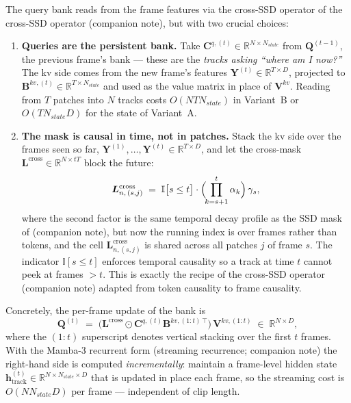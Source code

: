 \documentclass[11pt,a4paper]{article}
\begin{document}
The query bank reads from the frame features via the cross-SSD
operator of the cross-SSD operator (companion note), but with two crucial choices:

\begin{enumerate}
  \item[\textbf{(a)}] \textbf{Queries are the persistent bank.}
        Take $\bm{C}^{q,(t)} \!\in\! \mathbb{R}^{N\times N_{\!state}}$
        from $\bm{Q}^{(t-1)}$, the previous frame's bank — these are
        the \emph{tracks asking ``where am I now?''} The kv side
        comes from the new frame's features
        $\bm{Y}^{(t)} \in \mathbb{R}^{T\times D}$, projected to
        $\bm{B}^{kv,(t)} \in \mathbb{R}^{T\times N_{\!state}}$ and
        used as the value matrix in place of $\bm{V}^{kv}$. Reading
        from $T$ patches into $N$ tracks costs $O(N T N_{\!state})$
        in Variant~B or $O(T N_{\!state} D)$ for the state of
        Variant~A.
  \item[\textbf{(b)}] \textbf{The mask is causal in time, not in
        patches.} Stack the kv side over the frames seen so far,
        $\bm{Y}^{(1)},\dots,\bm{Y}^{(t)}\in\mathbb{R}^{T\times D}$,
        and let the cross-mask
        $\bm{L}^{\text{cross}}\in\mathbb{R}^{N\times tT}$ block the
        future:
        \begin{equation}\label{eq:track-causal-mask}
          \bm{L}^{\text{cross}}_{n,\,(s, j)}
           \;=\; \mathbb{I}\bigl[s\le t\bigr]\cdot
                 \Bigl(\!\prod_{k=s+1}^{t}\alpha_k\Bigr)\,\gamma_s,
        \end{equation}
        where the second factor is the same temporal decay profile
        as the SSD mask of (companion note), but now the running index
        is over frames rather than tokens, and the cell
        $\bm{L}^{\text{cross}}_{n,(s,j)}$ is shared across all
        patches $j$ of frame $s$. The indicator
        $\mathbb{I}[s\le t]$ enforces temporal causality so a track
        at time $t$ cannot peek at frames $>t$. This is exactly the
        recipe of the cross-SSD operator (companion note) adapted from token causality to
        frame causality.
\end{enumerate}
Concretely, the per-frame update of the bank is
\begin{equation}\label{eq:track-update}
  \boxed{\;
    \bm{Q}^{(t)}
     \;=\; \bigl(\bm{L}^{\text{cross}}\odot\bm{C}^{q,(t)}\bm{B}^{kv,(1{:}t)\,\top}\bigr)\,
            \bm{V}^{kv,(1{:}t)}
     \;\in\; \mathbb{R}^{N\times D},
  \;}
\end{equation}
where the $(1{:}t)$ superscript denotes vertical stacking over the
first $t$ frames. With the Mamba-3 recurrent form
(streaming recurrence; companion note) the right-hand side is computed
\emph{incrementally}: maintain a frame-level hidden state
$\bm{h}^{(t)}_{\text{track}} \in \mathbb{R}^{N\!\times\!N_{\!state}\!\times\!D}$
that is updated in place each frame, so the streaming cost is
$O(N N_{\!state} D)$ per frame — independent of clip length.
\end{document}
